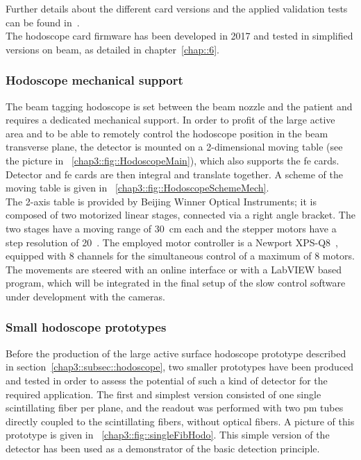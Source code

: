 Further details about the different card versions and the applied validation tests can be found in~\cite{Chen2017}.\\
The hodoscope card firmware has been developed in 2017 and tested in simplified versions on beam, as detailed in chapter~\ref{chap::6}.
           

\subsubsection{Hodoscope mechanical support}\label{chap3::subsubsec::HodoMechanics}

The beam tagging hodoscope is set between the beam nozzle and the patient and requires a dedicated mechanical support. In order to profit of the large active area and to be able to remotely control the hodoscope position in the beam transverse plane, the detector is mounted on a 2-dimensional moving table (see the picture in \figurename~\ref{chap3::fig::HodoscopeMain}), which also supports the \gls{fe} cards. Detector and \gls{fe} cards are then integral and translate together. A scheme of the moving table is given in \figurename~\ref{chap3::fig::HodoscopeSchemeMech}.\\
The 2-axis table is provided by Beijing Winner Optical Instruments; it is composed of two motorized linear stages, connected via a right angle bracket. The two stages have a moving range of 30~cm each and the stepper motors have a step resolution of 20~\charmum. The employed motor controller is a Newport XPS-Q8~\parencite{Newport2017}, equipped with 8 channels for the simultaneous control of a maximum of 8 motors. The movements are steered with an online interface or with a LabVIEW based program, which will be integrated in the final setup of the slow control software under development with the cameras.

\subsubsection{Small hodoscope prototypes}\label{chap3::subsubsec::SmallHodoProto}
Before the production of the large active surface hodoscope prototype described in section~\ref{chap3::subsec::hodoscope}, two smaller prototypes have been produced and tested in order to assess the potential of such a kind of detector for the required application. The first and simplest version consisted of one single scintillating fiber per plane, and the readout was performed with two \gls{pm} tubes directly coupled to the scintillating fibers, without optical fibers. A picture of this prototype is given in \figurename~\ref{chap3::fig::singleFibHodo}. This simple version of the detector has been used as a demonstrator of the basic detection principle.\\ 

